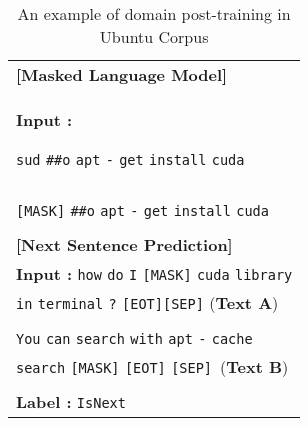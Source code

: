 \documentclass[a4paper]{article}
\begin{document}
\begin{table}[h]
\vspace{-0.2cm}
\begin{adjustbox}{width=0.4\textwidth}
\centering
\large
\begin{tabular}{l}
{\large\textbf{[Masked Language Model]}} \\
\textbf{Input :}

{\verb|sud|} {\verb|##o|} {\verb|apt|} {\verb|-|} {\verb|get|} {\verb|install|} {\verb|cuda|} \\\\

 {\verb|[MASK]|} {\verb|##o|} {\verb|apt|} {\verb|-|} {\verb|get|} {\verb|install|} {\verb|cuda|} \\\\


{\large\textbf{[Next Sentence Prediction]}} \\
\textbf{Input :}
{\verb|how|} {\verb|do|} {\verb|I|} {\verb|[MASK]|} {\verb|cuda|} {\verb|library|} \\{\verb|in|} {\verb|terminal|} {\verb|?|} {\verb|[EOT]|}{\verb|[SEP]|} (\textbf{Text A})\\\\
{\verb|You|} {\verb|can|} {\verb|search|} {\verb|with|} {\verb|apt|} {\verb|-|} {\verb|cache|} \\  {\verb|search|} {\verb|[MASK]|} {\verb|[EOT]|} {\verb|[SEP]|} \,(\textbf{Text B})\\\\

\textbf{Label :} {\verb|IsNext|}

\end{tabular}
\end{adjustbox}
\label{tab:dialog_example}
\caption{An example of domain post-training in Ubuntu Corpus}
\vspace{-0.5cm}

\end{table}
\end{document}
